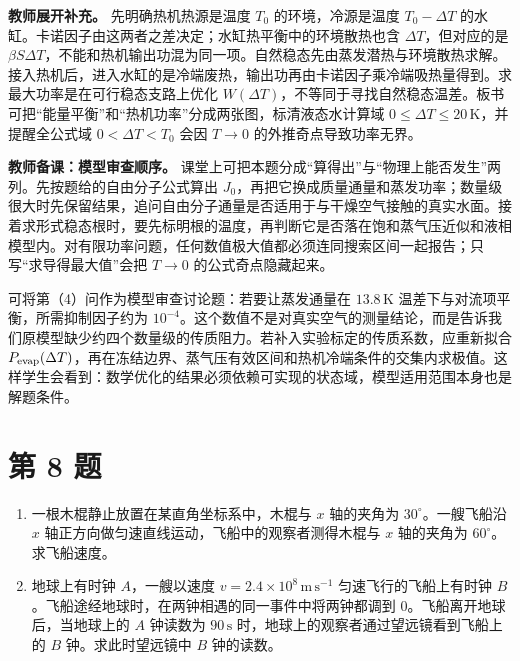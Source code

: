 \documentclass[12pt,a4paper,UTF8]{ctexart}
\newcommand{\tightlist}{\setlength{\itemsep}{0pt}\setlength{\parskip}{0pt}}
\begin{document}
\textbf{教师展开补充。} 先明确热机热源是温度 \(T_0\) 的环境，冷源是温度
\(T_0-\Delta T\)
的水缸。卡诺因子由这两者之差决定；水缸热平衡中的环境散热也含
\(\Delta T\)，但对应的是
\(\beta S\Delta T\)，不能和热机输出功混为同一项。自然稳态先由蒸发潜热与环境散热求解。接入热机后，进入水缸的是冷端废热，输出功再由卡诺因子乘冷端吸热量得到。求最大功率是在可行稳态支路上优化
\(W(\Delta T)\)，不等同于寻找自然稳态温差。板书可把``能量平衡''和``热机功率''分成两张图，标清液态水计算域
\(0\leq\Delta T\leq20\,\mathrm K\)，并提醒全公式域 \(0<\Delta T<T_0\)
会因 \(T\to0\) 的外推奇点导致功率无界。

\textbf{教师备课：模型审查顺序。}
课堂上可把本题分成``算得出''与``物理上能否发生''两列。先按题给的自由分子公式算出
\(J_0\)，再把它换成质量通量和蒸发功率；数量级很大时先保留结果，追问自由分子通量是否适用于与干燥空气接触的真实水面。接着求形式稳态根时，要先标明根的温度，再判断它是否落在饱和蒸气压近似和液相模型内。对有限功率问题，任何数值极大值都必须连同搜索区间一起报告；只写``求导得最大值''会把
\(T\to0\) 的公式奇点隐藏起来。

可将第（4）问作为模型审查讨论题：若要让蒸发通量在 \(13.8\,\mathrm K\)
温差下与对流项平衡，所需抑制因子约为
\(10^{-4}\)。这个数值不是对真实空气的测量结论，而是告诉我们原模型缺少约四个数量级的传质阻力。若补入实验标定的传质系数，应重新拟合
\(P_{\rm evap}(\Delta T)\)，再在冻结边界、蒸气压有效区间和热机冷端条件的交集内求极值。这样学生会看到：数学优化的结果必须依赖可实现的状态域，模型适用范围本身也是解题条件。

\newpage

\section{第 8 题}\label{ux7b2c-8-ux9898}

\begin{enumerate}
\def\labelenumi{\arabic{enumi}.}
\tightlist
\item
  一根木棍静止放置在某直角坐标系中，木棍与 \(x\) 轴的夹角为
  \(30^\circ\)。一艘飞船沿 \(x\)
  轴正方向做匀速直线运动，飞船中的观察者测得木棍与 \(x\) 轴的夹角为
  \(60^\circ\)。求飞船速度。
\item
  地球上有时钟 \(A\)，一艘以速度 \(v=2.4\times10^8\,\mathrm{m\,s^{-1}}\)
  匀速飞行的飞船上有时钟
  \(B\)。飞船途经地球时，在两钟相遇的同一事件中将两钟都调到
  0。飞船离开地球后，当地球上的 \(A\) 钟读数为 \(90\,\mathrm s\)
  时，地球上的观察者通过望远镜看到飞船上的 \(B\) 钟。求此时望远镜中
  \(B\) 钟的读数。
\end{enumerate}
\end{document}
